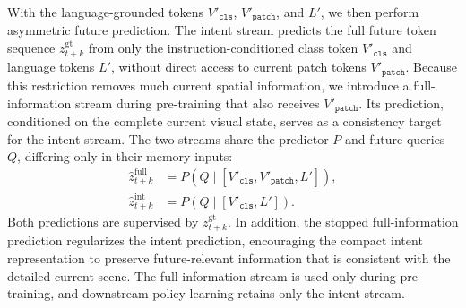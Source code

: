 With the language-grounded tokens $V'_{\texttt{cls}}$, $V'_{\texttt{patch}}$,
and $L'$, we then perform asymmetric future prediction. The intent stream predicts the full future token sequence $z^{\mathrm{gt}}_{t+k}$ from only the instruction-conditioned class token $V'_{\texttt{cls}}$ and language tokens $L'$, without direct access to current patch tokens $V'_{\texttt{patch}}$. Because this restriction removes much current spatial information,
we introduce a full-information stream during pre-training that also receives $V'_{\texttt{patch}}$. Its prediction, conditioned on the complete current visual state, serves as a consistency target for the intent stream. The two streams share the predictor $P$ and future queries $Q$, differing only in their memory inputs:
%
\begin{align}
\hat z^{\mathrm{full}}_{t+k}
&=P\!\left(Q\mid[V'_{\texttt{cls}},V'_{\texttt{patch}},L']\right),
\label{eq:full_stream}\\
\hat z^{\mathrm{int}}_{t+k}
&=P\!\left(Q\mid[V'_{\texttt{cls}},L']\right).
\label{eq:int_stream}
\end{align}
%
Both predictions are supervised by $z^{\mathrm{gt}}_{t+k}$. In addition, the stopped full-information prediction regularizes the intent prediction, encouraging the compact intent representation to preserve future-relevant information that is consistent with the detailed current scene. The full-information stream is used only during pre-training, and downstream policy learning retains only the intent stream.

